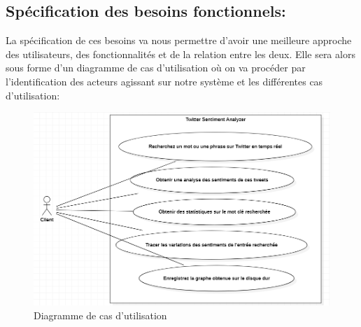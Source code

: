 \subsection{Spécification des besoins fonctionnels:}
La spécification de ces besoins va nous permettre d’avoir une meilleure approche des utilisateurs, des fonctionnalités et de la relation entre les deux. Elle sera alors sous forme d'un diagramme de cas d’utilisation où on va procéder par l'identification des acteurs agissant sur notre système et les différentes cas d'utilisation: \\
\begin{figure}[H]
    \centering
    \includegraphics[width=\textwidth]{chapitre2/assets/useCase.png}
    \caption{Diagramme de cas d'utilisation}
    \label{fig:my_label}
\end{figure}
